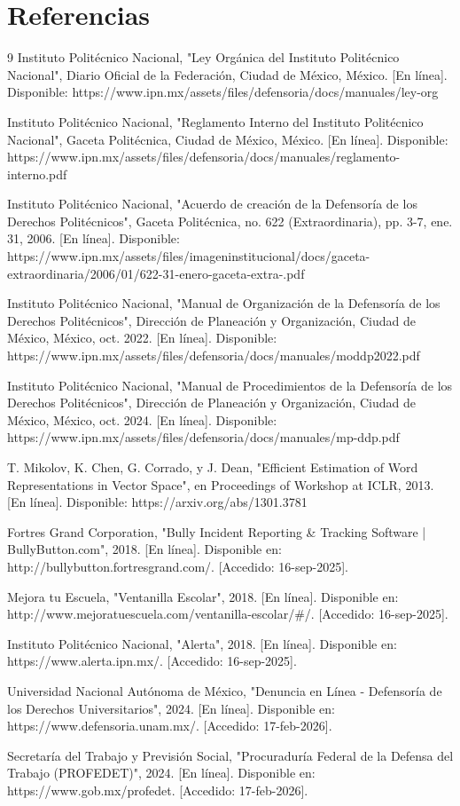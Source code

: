 \chapter{Referencias}

\begin{thebibliography}{9}
Instituto Politécnico Nacional, "Ley Orgánica del Instituto Politécnico Nacional", Diario Oficial de la Federación, Ciudad de México, México. [En línea]. Disponible: https://www.ipn.mx/assets/files/defensoria/docs/manuales/ley-org%

Instituto Politécnico Nacional, "Reglamento Interno del Instituto Politécnico Nacional", Gaceta Politécnica, Ciudad de México, México. [En línea]. Disponible: https://www.ipn.mx/assets/files/defensoria/docs/manuales/reglamento-interno.pdf

Instituto Politécnico Nacional, "Acuerdo de creación de la Defensoría de los Derechos Politécnicos", Gaceta Politécnica, no. 622 (Extraordinaria), pp. 3-7, ene. 31, 2006. [En línea]. Disponible: https://www.ipn.mx/assets/files/imageninstitucional/docs/gaceta-extraordinaria/2006/01/622-31-enero-gaceta-extra-.pdf

Instituto Politécnico Nacional, "Manual de Organización de la Defensoría de los Derechos Politécnicos", Dirección de Planeación y Organización, Ciudad de México, México, oct. 2022. [En línea]. Disponible: https://www.ipn.mx/assets/files/defensoria/docs/manuales/moddp2022.pdf

Instituto Politécnico Nacional, "Manual de Procedimientos de la Defensoría de los Derechos Politécnicos", Dirección de Planeación y Organización, Ciudad de México, México, oct. 2024. [En línea]. Disponible: https://www.ipn.mx/assets/files/defensoria/docs/manuales/mp-ddp.pdf

T. Mikolov, K. Chen, G. Corrado, y J. Dean, "Efficient Estimation of Word Representations in Vector Space", en Proceedings of Workshop at ICLR, 2013. [En línea]. Disponible: https://arxiv.org/abs/1301.3781

Fortres Grand Corporation, "Bully Incident Reporting \& Tracking Software | BullyButton.com", 2018. [En línea]. Disponible en: http://bullybutton.fortresgrand.com/. [Accedido: 16-sep-2025].

Mejora tu Escuela, "Ventanilla Escolar", 2018. [En línea]. Disponible en: http://www.mejoratuescuela.com/ventanilla-escolar/\#/. [Accedido: 16-sep-2025].

Instituto Politécnico Nacional, "Alerta", 2018. [En línea]. Disponible en: https://www.alerta.ipn.mx/. [Accedido: 16-sep-2025].

Universidad Nacional Autónoma de México, "Denuncia en Línea - Defensoría de los Derechos Universitarios", 2024. [En línea]. Disponible en: https://www.defensoria.unam.mx/. [Accedido: 17-feb-2026].

Secretaría del Trabajo y Previsión Social, "Procuraduría Federal de la Defensa del Trabajo (PROFEDET)", 2024. [En línea]. Disponible en: https://www.gob.mx/profedet. [Accedido: 17-feb-2026].
\end{thebibliography}